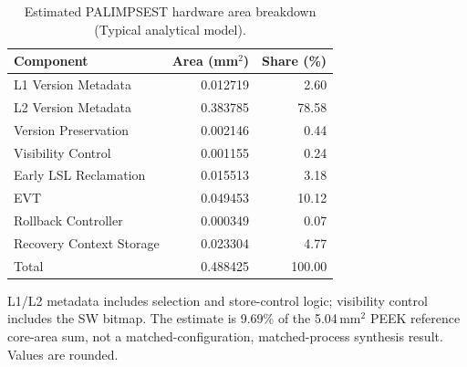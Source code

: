 \begin{table}[t]
\centering
\small
\caption{Estimated PALIMPSEST hardware area breakdown (Typical analytical model).}
\label{tab:palimpsest-area}
\begin{tabular}{lrr}
\toprule
Component & Area (mm$^2$) & Share (\%) \\
\midrule
L1 Version Metadata & 0.012719 & 2.60 \\
L2 Version Metadata & 0.383785 & 78.58 \\
Version Preservation & 0.002146 & 0.44 \\
Visibility Control & 0.001155 & 0.24 \\
Early LSL Reclamation & 0.015513 & 3.18 \\
EVT & 0.049453 & 10.12 \\
Rollback Controller & 0.000349 & 0.07 \\
Recovery Context Storage & 0.023304 & 4.77 \\
\midrule
Total & 0.488425 & 100.00 \\
\bottomrule
\end{tabular}
\par\vspace{2pt}
\begin{minipage}{\columnwidth}\footnotesize
L1/L2 metadata includes selection and store-control logic; visibility control includes the SW bitmap. The estimate is 9.69\% of the 5.04\,mm$^2$ PEEK reference core-area sum, not a matched-configuration, matched-process synthesis result. Values are rounded.
\end{minipage}
\end{table}
